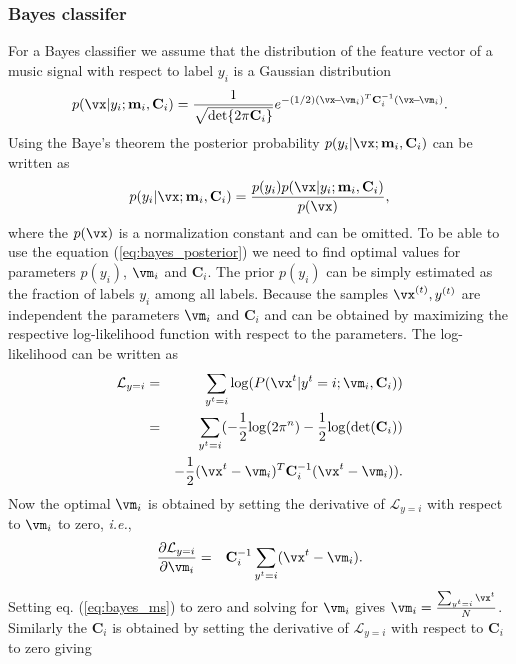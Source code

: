 \documentclass[aps,prb,10pt,twocolumn,groupedaddress]{revtex4-1}
\begin{document}
\subsubsection{Bayes classifer}
\label{sec:bayes_classifier}
For a Bayes classifier we assume that the distribution of the feature vector of
a music signal with respect to label $y_i$ is a Gaussian distribution
\begin{equation}
  p(\vx|y_i;\mathbf{m}_{i},\mathbf{C}_{i}) = \frac{1}{\sqrt{\det\{ 2 \pi \mathbf{C}_{i} \}}}e^{-(1/2) (\vx\!-\!\vm_{i})^{T} \mathbf{C}_{i}^{-1} (\vx\!-\!\vm_{i})}.
  \label{eq:bayes_gaussian_distribution}
\end{equation}
Using the Baye's theorem the posterior probability
$p(y_i|\vx;\mathbf{m}_{i},\mathbf{C}_{i})$ can be written as
\begin{equation}
  p(y_i|\vx;\mathbf{m}_{i},\mathbf{C}_{i}) = \frac{p(y_i)p(\vx|y_i;\mathbf{m}_{i},\mathbf{C}_{i})}{p(\vx)},
  \label{eq:bayes_posterior}
\end{equation}
where the $p(\vx)$ is a normalization constant and can be omitted. To be able to
use the equation (\ref{eq:bayes_posterior}) we need to find optimal values for
parameters $p(y_i)$, $\vm_i$ and $\mathbf{C}_i$. The prior $p(y_i)$ can be
simply estimated as the fraction of labels $y_i$ among all labels.
Because the samples ${\vx^{(t)}, y^{(t)}}$ are independent the parameters
$\vm_i$ and $\mathbf{C}_i$ and can be obtained by
maximizing the respective log-likelihood function with respect to the
parameters. The log-likelihood
can be written as
\begin{eqnarray}
  \mathcal{L}_{y=i}&=&\sum_{y^t=i}\mathrm{log}(P(\vx^t|y^t=i;\vm_i,\mathbf{C}_i))\nonumber\\
  &=&\sum_{y^t=i}(-\frac{1}{2}\mathrm{log}(2\pi^n)-\frac{1}{2}\mathrm{log}(\mathrm{det}(\mathbf{C}_i))\nonumber\\
  & &-\frac{1}{2}(\vx^t-\vm_i)^T\mathbf{C}_i^{-1}(\vx^t-\vm_i)).
\end{eqnarray}
Now the optimal $\vm_i$ is obtained by setting the derivative of
$\mathcal{L}_{y=i}$ with respect to $\vm_i$ to zero, \textit{i.e.},
\begin{eqnarray}
  \frac{\partial{\mathcal{L}_{y=i}}}{\partial\vm_i}&=&\mathbf{C}_i^{-1}\sum_{y^t=i}(\vx^t-\vm_i).
  \label{eq:bayes_ms}
\end{eqnarray}
Setting eq. (\ref{eq:bayes_ms}) to zero and solving for $\vm_i$ gives
$\vm_i=\frac{\sum_{y^t=i}\vx^t}{N}$. Similarly the
$\mathbf{C}_i$ is obtained  by setting the derivative of $\mathcal{L}_{y=i}$ with respect to $\mathbf{C}_i$ to zero giving
\end{document}
